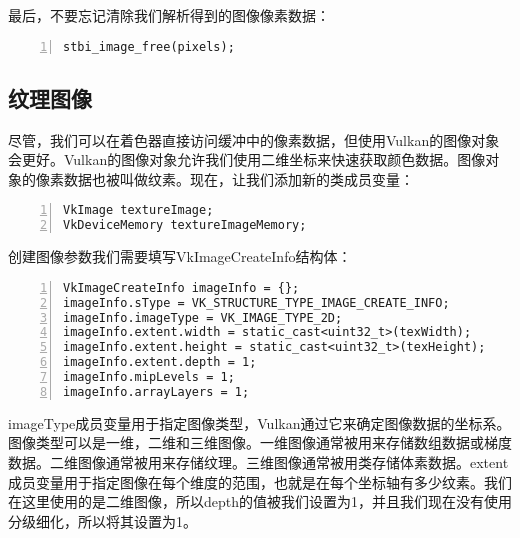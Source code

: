\documentclass{ctexart}
\begin{document}
最后，不要忘记清除我们解析得到的图像像素数据：

\begin{lstlisting}[language={[ANSI]C},keywordstyle=\color{blue!70},commentstyle=\color{red!50!green!50!blue!50},frame=shadowbox, rulesepcolor=\color{red!20!green!20!blue!20},basicstyle=\small,numbers=left, numberstyle=\tiny,breaklines=true]
stbi_image_free(pixels);
\end{lstlisting}

\subsection{纹理图像}

尽管，我们可以在着色器直接访问缓冲中的像素数据，但使用Vulkan的图像对象会更好。Vulkan的图像对象允许我们使用二维坐标来快速获取颜色数据。图像对象的像素数据也被叫做纹素。现在，让我们添加新的类成员变量：

\begin{lstlisting}[language={[ANSI]C},keywordstyle=\color{blue!70},commentstyle=\color{red!50!green!50!blue!50},frame=shadowbox, rulesepcolor=\color{red!20!green!20!blue!20},basicstyle=\small,numbers=left, numberstyle=\tiny,breaklines=true]
VkImage textureImage;
VkDeviceMemory textureImageMemory;
\end{lstlisting}

创建图像参数我们需要填写VkImageCreateInfo结构体：

\begin{lstlisting}[language={[ANSI]C},keywordstyle=\color{blue!70},commentstyle=\color{red!50!green!50!blue!50},frame=shadowbox, rulesepcolor=\color{red!20!green!20!blue!20},basicstyle=\small,numbers=left, numberstyle=\tiny,breaklines=true]
VkImageCreateInfo imageInfo = {};
imageInfo.sType = VK_STRUCTURE_TYPE_IMAGE_CREATE_INFO;
imageInfo.imageType = VK_IMAGE_TYPE_2D;
imageInfo.extent.width = static_cast<uint32_t>(texWidth);
imageInfo.extent.height = static_cast<uint32_t>(texHeight);
imageInfo.extent.depth = 1;
imageInfo.mipLevels = 1;
imageInfo.arrayLayers = 1;
\end{lstlisting}

imageType成员变量用于指定图像类型，Vulkan通过它来确定图像数据的坐标系。图像类型可以是一维，二维和三维图像。一维图像通常被用来存储数组数据或梯度数据。二维图像通常被用来存储纹理。三维图像通常被用类存储体素数据。extent成员变量用于指定图像在每个维度的范围，也就是在每个坐标轴有多少纹素。我们在这里使用的是二维图像，所以depth的值被我们设置为1，并且我们现在没有使用分级细化，所以将其设置为1。
\end{document}
